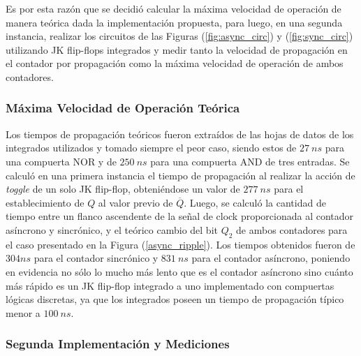 Es por esta razón que se decidió calcular la máxima velocidad de operación de manera teórica dada la implementación propuesta, para luego, en una segunda instancia, realizar los circuitos de las Figuras (\ref{fig:async_circ}) y (\ref{fig:sync_circ}) utilizando JK flip-flops integrados y medir tanto la velocidad de propagación en el contador por propagación como la máxima velocidad de operación de ambos contadores.

\subsubsection{Máxima Velocidad de Operación Teórica}

Los tiempos de propagación teóricos fueron extraídos de las hojas de datos de los integrados utilizados y tomado siempre el peor caso, siendo estos de $27 \ ns$ para una compuerta NOR y de $250 \ ns$ para una compuerta AND de tres entradas. Se calculó en una primera instancia el tiempo de propagación al realizar la acción de \textit{toggle} de un solo JK flip-flop, obteniéndose un valor de $277 \ ns$ para el establecimiento de $Q$ al valor previo de $\overline{Q}$. Luego, se calculó la cantidad de tiempo entre un flanco ascendente de la señal de clock proporcionada al contador asíncrono y sincrónico, y el teórico cambio del bit $Q_2$ de ambos contadores para el caso presentado en la Figura (\ref{async_ripple}). Los tiempos obtenidos fueron de $304 ns$ para el contador sincrónico y $831 \ ns$ para el contador asíncrono, poniendo en evidencia no sólo lo mucho más lento que es el contador asíncrono sino cuánto más rápido es un JK flip-flop integrado a uno implementado con compuertas lógicas discretas, ya que los integrados poseen un tiempo de propagación típico menor a $100 \ ns$. 

\subsubsection{Segunda Implementación y Mediciones}

